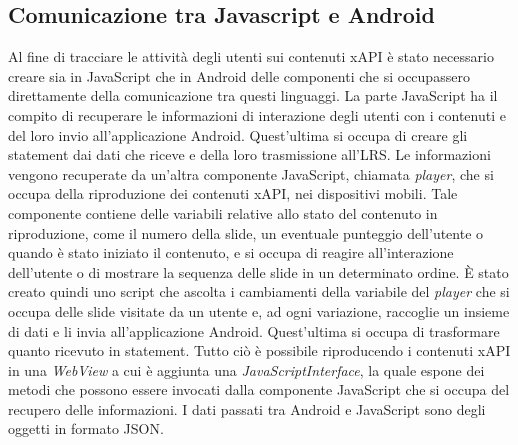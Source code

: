 \documentclass[../Tesi.tex]{subfiles}
\begin{document}
	\subsection{Comunicazione tra Javascript e Android}
	Al fine di tracciare le attività degli utenti sui contenuti xAPI è stato necessario creare sia in JavaScript che in Android delle componenti che si occupassero direttamente della comunicazione tra questi linguaggi. La parte JavaScript ha il compito di recuperare le informazioni di interazione degli utenti con i contenuti e del loro invio all'applicazione Android. Quest'ultima si occupa di creare gli statement dai dati che riceve e della loro trasmissione all'LRS. Le informazioni vengono recuperate da un'altra componente JavaScript, chiamata \textit{player}, che si occupa della riproduzione dei contenuti xAPI, nei dispositivi mobili. Tale componente contiene delle variabili relative allo stato del contenuto in riproduzione, come il numero della slide, un eventuale punteggio dell'utente o quando è stato iniziato il contenuto, e si occupa di reagire all'interazione dell'utente o di mostrare la sequenza delle slide in un determinato ordine. 
	È stato creato quindi uno script che ascolta i cambiamenti della variabile del \textit{player} che si occupa delle slide visitate da un utente e, ad ogni variazione, raccoglie un insieme di dati e li invia all'applicazione Android. Quest'ultima si occupa di trasformare quanto ricevuto in statement. Tutto ciò è possibile riproducendo i contenuti xAPI in una \textit{WebView} a cui è aggiunta una \textit{JavaScriptInterface}, la quale espone dei metodi che possono essere invocati dalla componente JavaScript che si occupa del recupero delle informazioni. I dati passati tra Android e JavaScript sono degli oggetti in formato JSON.
\end{document}
